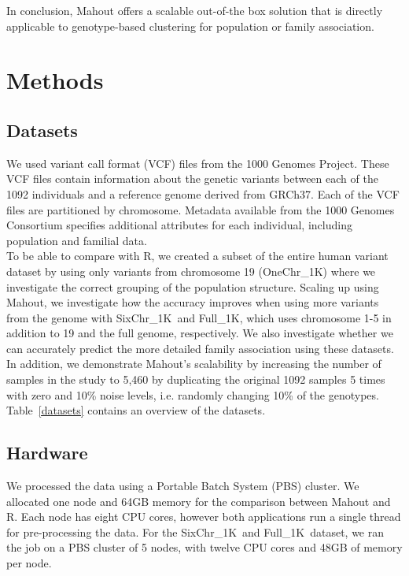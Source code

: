 \documentclass[twocolumn]{bmcart}%
\newcommand{\OneReal}{OneChr\_1K}
\newcommand{\SixReal}{SixChr\_1K}
\newcommand{\FullReal}{Full\_1K}
\begin{document}
In conclusion, Mahout offers a scalable out-of-the box solution that is directly applicable to genotype-based clustering for population or family association. 



\section*{Methods}
\subsection*{Datasets}
We used variant call format (VCF) files from the 1000 Genomes Project.
These VCF files contain information about the genetic variants between each of the 1092 individuals and a reference genome derived from GRCh37. 
Each of the VCF files are partitioned by chromosome.
Metadata available from the 1000 Genomes Consortium specifies additional attributes for each individual, including population and familial data.\\
To be able to compare with R, we created a subset of the entire human variant dataset by using only variants from chromosome 19 (\OneReal ) where we investigate the correct grouping of the population structure. 
Scaling up using Mahout, we investigate how the accuracy improves when using more variants from the genome with \SixReal\ and \FullReal, which uses chromosome 1-5 in addition to 19 and the full genome, respectively. 
We also investigate whether we can accurately predict the more detailed family association using these datasets. 
In addition, we demonstrate Mahout's scalability by increasing the number of samples in the study to 5,460 by duplicating the original 1092 samples 5 times with zero and 10\% noise levels, i.e. randomly changing 10\% of the genotypes. 
Table~\ref{datasets} contains an overview of the datasets.

\subsection*{Hardware}
We processed the data using a Portable Batch System (PBS) cluster. We allocated one node and 64GB memory for the comparison between Mahout and R.
Each node has eight CPU cores, however both applications run a single thread for pre-processing the data.
For the \SixReal\ and \FullReal\ dataset, we ran the job on a PBS cluster of 5 nodes, with twelve CPU cores and 48GB of memory per node.
\end{document}
